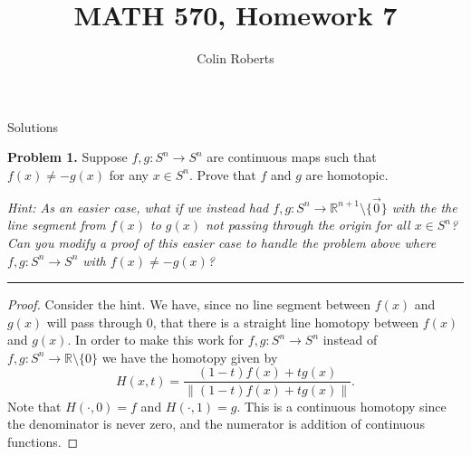 \documentclass[leqno]{article}
\author{Colin Roberts}
\title{MATH 570, Homework 7}
\theoremstyle{nonumberplain}
\newtheorem{proof}{Proof}
\newcommand{\R}{\ensuremath{\mathbb{R}}}
\begin{document}
\maketitle
\begin{large}
\begin{center}
Solutions
\end{center}
\end{large}
\pagebreak


\noindent\textbf{Problem 1.}  Suppose $f,g\colon S^n\to S^n$ are continuous maps such that $f(x)\neq -g(x)$ for any $x\in S^n$. Prove that $f$ and $g$ are homotopic.

\emph{Hint: As an easier case, what if we instead had $f,g\colon S^n\to \R^{n+1}\setminus\{\vec{0}\}$ with the the line segment from $f(x)$ to $g(x)$ not passing through the origin for all $x\in S^n$? Can you modify a proof of this easier case to handle the problem above where $f,g\colon S^n\to S^n$ with $f(x)\neq -g(x)$?}

\noindent\rule[0.5ex]{\linewidth}{1pt}

\begin{proof}
Consider the hint.  We have, since no line segment between $f(x)$ and $g(x)$ will pass through $0$, that there is a straight line homotopy between $f(x)$ and $g(x)$.  In order to make this work for $f,g\colon S^n \to S^n$ instead of $f,g \colon S^n \to \R\setminus \{0\}$ we have the homotopy given by
\[
H(x,t)=\frac{(1-t)f(x)+tg(x)}{\|(1-t)f(x)+tg(x)\|}.
\]
Note that $H(\cdot,0)=f$ and $H(\cdot, 1)=g$.  This is a continuous homotopy since the denominator is never zero, and the numerator is addition of continuous functions.
\end{proof}

\pagebreak

\end{document}
